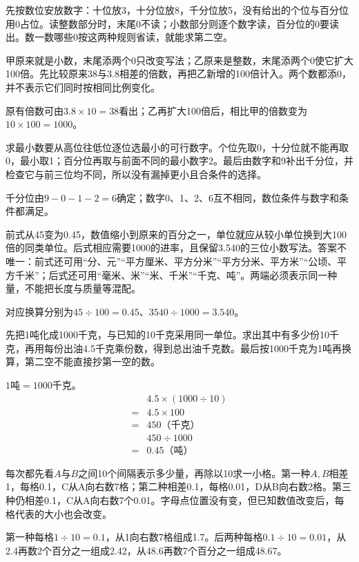 \documentclass[multi=snippet,border=0pt]{standalone}
\newenvironment{snippet}[3]{\begin{minipage}{#1bp}\color{answerred}\fontsize{#2}{#3}\selectfont\raggedright}{\end{minipage}}
\begin{document}
\begin{snippet}{505}{11.5}{14}先按数位安放数字：十位放3，十分位放8，千分位放5，没有给出的个位与百分位用0占位。读整数部分时，末尾0不读；小数部分则逐个数字读，百分位的0要读出。数一数哪些0按这两种规则省读，就能求第二空。\end{snippet}
\begin{snippet}{505}{11.5}{14}甲原来就是小数，末尾添两个0只改变写法；乙原来是整数，末尾添两个0使它扩大100倍。先比较原来38与3.8相差的倍数，再把乙新增的100倍计入。两个数都添0，并不表示它们同时按相同比例变化。\par 原有倍数可由\(3.8\times10=38\)看出；乙再扩大100倍后，相比甲的倍数变为\(10\times100=1000\)。\end{snippet}
\begin{snippet}{505}{11.5}{14}求最小数要从高位往低位逐位选最小的可行数字。个位先取0，十分位就不能再取0，最小取1；百分位再取与前面不同的最小数字2。最后由数字和9补出千分位，并检查它与前三位均不同，所以没有漏掉更小且合条件的选择。\par 千分位由\(9-0-1-2=6\)确定；数字0、1、2、6互不相同，数位条件与数字和条件都满足。\end{snippet}
\begin{snippet}{505}{11.5}{14}前式从45变为0.45，数值缩小到原来的百分之一，单位就应从较小单位换到大100倍的同类单位。后式相应需要1000的进率，且保留3.540的三位小数写法。答案不唯一：前式还可用“分、元”“平方厘米、平方分米”“平方分米、平方米”“公顷、平方千米”；后式还可用“毫米、米”“米、千米”“千克、吨”。两端必须表示同一种量，不能把长度与质量等混配。\par 对应换算分别为\(45\div100=0.45\)、\(3540\div1000=3.540\)。\end{snippet}
\begin{snippet}{505}{11.5}{14}先把1吨化成1000千克，与已知的10千克采用同一单位。求出其中有多少份10千克，再用每份出油4.5千克乘份数，得到总出油千克数。最后按1000千克为1吨再换算，第二空不能直接抄第一空的数。\par \(1\text{吨}=1000\text{千克}\)。\[\begin{aligned}&4.5\times(1000\div10)\\={}&4.5\times100\\={}&450\text{（千克）}\\&450\div1000\\={}&0.45\text{（吨）}\end{aligned}\]\end{snippet}
\begin{snippet}{505}{11.5}{14}每次都先看\(A\)与\(B\)之间10个间隔表示多少量，再除以10求一小格。第一种\(A,B\)相差1，每格0.1，C从A向右数7格；第二种相差0.1，每格0.01，D从B向右数2格。第三种仍相差0.1，C从A向右数7个0.01。字母点位置没有变，但已知数值改变后，每格代表的大小也会改变。\par 第一种每格\(1\div10=0.1\)，从1向右数7格组成1.7。后两种每格\(0.1\div10=0.01\)，从2.4再数2个百分之一组成2.42，从48.6再数7个百分之一组成48.67。\end{snippet}
\end{document}
